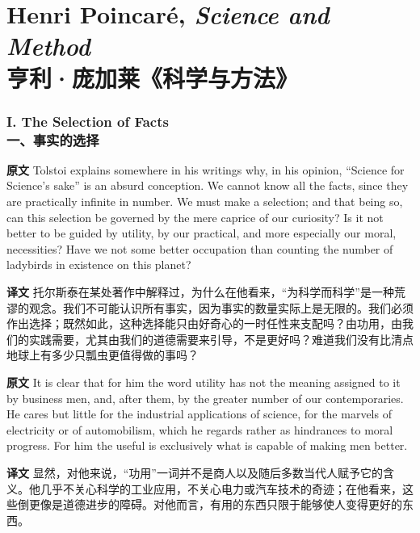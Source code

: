 \documentclass[UTF8]{ctexart}
\newenvironment{english}{\par\small\noindent\textbf{原文}\quad\ignorespaces}{\par}
\newenvironment{zhtranslation}{\par\noindent\textbf{译文}\quad\ignorespaces}{\par\vspace{0.35em}}
\begin{document}
\part*{Henri Poincaré, \emph{Science and Method}\\亨利·庞加莱《科学与方法》}

\section*{I. The Selection of Facts\\一、事实的选择}

\begin{english}
Tolstoi explains somewhere in his writings why, in his opinion, “Science for Science's sake” is an absurd conception. We cannot know all the facts, since they are practically infinite in number. We must make a selection; and that being so, can this selection be governed by the mere caprice of our curiosity? Is it not better to be guided by utility, by our practical, and more especially our moral, necessities? Have we not some better occupation than counting the number of ladybirds in existence on this planet?
\end{english}
\begin{zhtranslation}
托尔斯泰在某处著作中解释过，为什么在他看来，“为科学而科学”是一种荒谬的观念。我们不可能认识所有事实，因为事实的数量实际上是无限的。我们必须作出选择；既然如此，这种选择能只由好奇心的一时任性来支配吗？由功用，由我们的实践需要，尤其由我们的道德需要来引导，不是更好吗？难道我们没有比清点地球上有多少只瓢虫更值得做的事吗？\end{zhtranslation}

\begin{english}
It is clear that for him the word utility has not the meaning assigned to it by business men, and, after them, by the greater number of our contemporaries. He cares but little for the industrial applications of science, for the marvels of electricity or of automobilism, which he regards rather as hindrances to moral progress. For him the useful is exclusively what is capable of making men better.
\end{english}
\begin{zhtranslation}
显然，对他来说，“功用”一词并不是商人以及随后多数当代人赋予它的含义。他几乎不关心科学的工业应用，不关心电力或汽车技术的奇迹；在他看来，这些倒更像是道德进步的障碍。对他而言，有用的东西只限于能够使人变得更好的东西。\end{zhtranslation}
\end{document}
